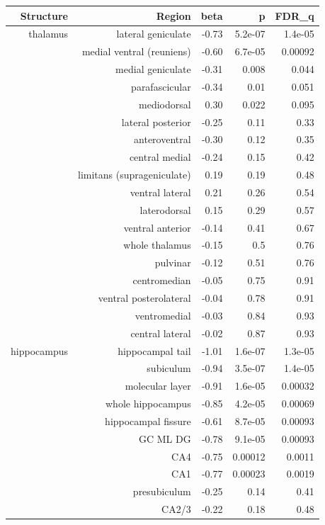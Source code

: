\documentclass[
]{article}
\begin{document}
\begin{longtable}{rrrrr}
\toprule
Structure & Region & beta & p & FDR\_q \\ 
\midrule\addlinespace[2.5pt]
thalamus & lateral geniculate & -0.73 & 5.2e-07 & 1.4e-05 \\ 
 & medial ventral (reuniens) & -0.60 & 6.7e-05 & 0.00092 \\ 
 & medial geniculate & -0.31 & 0.008 & 0.044 \\ 
 & parafascicular & -0.34 & 0.01 & 0.051 \\ 
 & mediodorsal & 0.30 & 0.022 & 0.095 \\ 
 & lateral posterior & -0.25 & 0.11 & 0.33 \\ 
 & anteroventral & -0.30 & 0.12 & 0.35 \\ 
 & central medial & -0.24 & 0.15 & 0.42 \\ 
 & limitans (suprageniculate) & 0.19 & 0.19 & 0.48 \\ 
 & ventral lateral & 0.21 & 0.26 & 0.54 \\ 
 & laterodorsal & 0.15 & 0.29 & 0.57 \\ 
 & ventral anterior & -0.14 & 0.41 & 0.67 \\ 
 &  whole thalamus & -0.15 & 0.5 & 0.76 \\ 
 & pulvinar & -0.12 & 0.51 & 0.76 \\ 
 & centromedian & -0.05 & 0.75 & 0.91 \\ 
 & ventral posterolateral & -0.04 & 0.78 & 0.91 \\ 
 & ventromedial & -0.03 & 0.84 & 0.93 \\ 
 & central lateral & -0.02 & 0.87 & 0.93 \\ 
hippocampus & hippocampal tail & -1.01 & 1.6e-07 & 1.3e-05 \\ 
 & subiculum & -0.94 & 3.5e-07 & 1.4e-05 \\ 
 & molecular layer & -0.91 & 1.6e-05 & 0.00032 \\ 
 & whole hippocampus & -0.85 & 4.2e-05 & 0.00069 \\ 
 & hippocampal fissure & -0.61 & 8.7e-05 & 0.00093 \\ 
 & GC ML DG & -0.78 & 9.1e-05 & 0.00093 \\ 
 & CA4 & -0.75 & 0.00012 & 0.0011 \\ 
 & CA1 & -0.77 & 0.00023 & 0.0019 \\ 
 & presubiculum & -0.25 & 0.14 & 0.41 \\ 
 & CA2/3 & -0.22 & 0.18 & 0.48 \\ 

\end{longtable}
\end{document}
